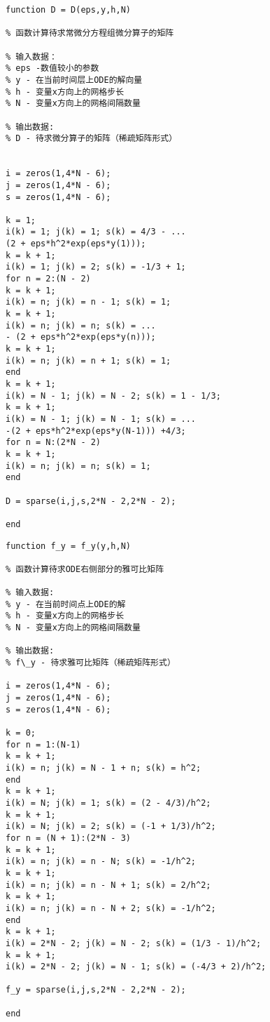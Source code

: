 \documentclass[twoside]{book}
\begin{document}
\begin{CJK*}{GBK}{song}
%
\begin{lstlisting}
function D = D(eps,y,h,N)

% 函数计算待求常微分方程组微分算子的矩阵

% 输入数据：
% eps -数值较小的参数
% y - 在当前时间层上ODE的解向量
% h - 变量x方向上的网格步长
% N - 变量x方向上的网格间隔数量

% 输出数据:
% D - 待求微分算子的矩阵（稀疏矩阵形式）


i = zeros(1,4*N - 6);
j = zeros(1,4*N - 6);
s = zeros(1,4*N - 6);

k = 1;
i(k) = 1; j(k) = 1; s(k) = 4/3 - ...
(2 + eps*h^2*exp(eps*y(1)));
k = k + 1;
i(k) = 1; j(k) = 2; s(k) = -1/3 + 1;
for n = 2:(N - 2)
k = k + 1;
i(k) = n; j(k) = n - 1; s(k) = 1;
k = k + 1;
i(k) = n; j(k) = n; s(k) = ...
- (2 + eps*h^2*exp(eps*y(n)));
k = k + 1;
i(k) = n; j(k) = n + 1; s(k) = 1;
end
k = k + 1;
i(k) = N - 1; j(k) = N - 2; s(k) = 1 - 1/3;
k = k + 1;
i(k) = N - 1; j(k) = N - 1; s(k) = ...
-(2 + eps*h^2*exp(eps*y(N-1))) +4/3;
for n = N:(2*N - 2)
k = k + 1;
i(k) = n; j(k) = n; s(k) = 1;
end

D = sparse(i,j,s,2*N - 2,2*N - 2);

end
\end{lstlisting}


%
\begin{lstlisting}
function f_y = f_y(y,h,N)

% 函数计算待求ODE右侧部分的雅可比矩阵

% 输入数据:
% y - 在当前时间点上ODE的解
% h - 变量x方向上的网格步长
% N - 变量x方向上的网格间隔数量

% 输出数据:
% f\_y - 待求雅可比矩阵（稀疏矩阵形式）

i = zeros(1,4*N - 6);
j = zeros(1,4*N - 6);
s = zeros(1,4*N - 6);

k = 0;
for n = 1:(N-1)
k = k + 1;
i(k) = n; j(k) = N - 1 + n; s(k) = h^2;
end
k = k + 1;
i(k) = N; j(k) = 1; s(k) = (2 - 4/3)/h^2;
k = k + 1;
i(k) = N; j(k) = 2; s(k) = (-1 + 1/3)/h^2;
for n = (N + 1):(2*N - 3)
k = k + 1;
i(k) = n; j(k) = n - N; s(k) = -1/h^2;
k = k + 1;
i(k) = n; j(k) = n - N + 1; s(k) = 2/h^2;
k = k + 1;
i(k) = n; j(k) = n - N + 2; s(k) = -1/h^2;
end
k = k + 1;
i(k) = 2*N - 2; j(k) = N - 2; s(k) = (1/3 - 1)/h^2;
k = k + 1;
i(k) = 2*N - 2; j(k) = N - 1; s(k) = (-4/3 + 2)/h^2;

f_y = sparse(i,j,s,2*N - 2,2*N - 2);

end
\end{lstlisting}


\end{CJK*}
\end{document}
